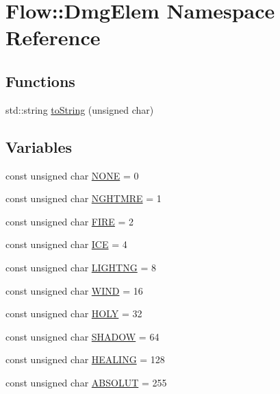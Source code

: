 \hypertarget{namespace_flow_1_1_dmg_elem}{}\section{Flow\+:\+:Dmg\+Elem Namespace Reference}
\label{namespace_flow_1_1_dmg_elem}
\subsection*{Functions}
\begin{DoxyCompactItemize}
\item 
std\+::string \hyperlink{namespace_flow_1_1_dmg_elem_ad710b6c12e5119059a6975e77bdc5f80}{to\+String} (unsigned char)
\end{DoxyCompactItemize}
\subsection*{Variables}
\begin{DoxyCompactItemize}
\item 
const unsigned char \hyperlink{namespace_flow_1_1_dmg_elem_a2c7180f371963927ddcc5b333568a33b}{N\+O\+NE} = 0
\item 
const unsigned char \hyperlink{namespace_flow_1_1_dmg_elem_ab1e9e2aae5dd0691b09de8ade59d3984}{N\+G\+H\+T\+M\+RE} = 1
\item 
const unsigned char \hyperlink{namespace_flow_1_1_dmg_elem_aa25b22e8ba30a8c765912ceda3110cab}{F\+I\+RE} = 2
\item 
const unsigned char \hyperlink{namespace_flow_1_1_dmg_elem_a30739bfaff89a78947afa83acd27fc16}{I\+CE} = 4
\item 
const unsigned char \hyperlink{namespace_flow_1_1_dmg_elem_ae77f57817a01c597933d72de6f00df36}{L\+I\+G\+H\+T\+NG} = 8
\item 
const unsigned char \hyperlink{namespace_flow_1_1_dmg_elem_ab161888a4cffbc8799e450085f9411b9}{W\+I\+ND} = 16
\item 
const unsigned char \hyperlink{namespace_flow_1_1_dmg_elem_a9cf12825628ffbf718079827d6706619}{H\+O\+LY} = 32
\item 
const unsigned char \hyperlink{namespace_flow_1_1_dmg_elem_a97d51ad54a8dceed5f5f3e0e856453e1}{S\+H\+A\+D\+OW} = 64
\item 
const unsigned char \hyperlink{namespace_flow_1_1_dmg_elem_af91abc6a76da493ae0aab97998f10a3c}{H\+E\+A\+L\+I\+NG} = 128
\item 
const unsigned char \hyperlink{namespace_flow_1_1_dmg_elem_a91b40559f8ea36309d1459ae990e7737}{A\+B\+S\+O\+L\+UT} = 255
\end{DoxyCompactItemize}


